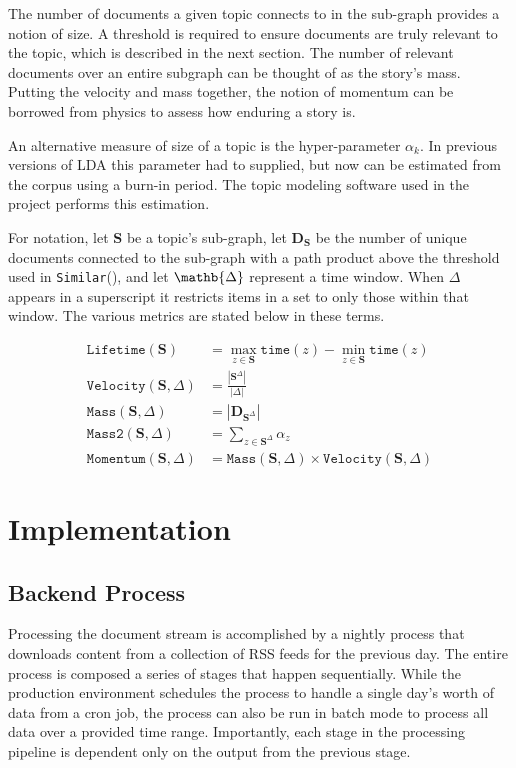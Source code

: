 \documentclass[10pt]{article}
\begin{document}
The number of documents a given topic connects to in the sub-graph provides a notion of size.  A threshold is required to ensure documents are truly relevant to the topic, which is described in the next section.  The number of relevant documents over an entire subgraph can be thought of as the story's mass. Putting the velocity and mass together, the notion of momentum can be borrowed from physics to assess how enduring a story is. 

An alternative measure of size of a topic is the hyper-parameter $\alpha_k$.  In previous versions of LDA this parameter had to supplied, but now can be estimated from the corpus using a burn-in period.  The topic modeling software used in the project performs this estimation.

For notation, let $\mathbf{S}$ be a topic's sub-graph, let $\mathbf{D}_\mathbf{S}$ be the number of unique documents connected to the sub-graph with a path product above the threshold used in \texttt{Similar}(), and let $\mathb{\Delta}$ represent a time window.  When $\Delta$ appears in a superscript it restricts items in a set to only those within that window.  The various metrics are stated below in these terms.

\begin{align}
\texttt{Lifetime}(\mathbf{S}) &=\max_{z \in \mathbf{S}} \texttt{time}(z) - \min_{z \in \mathbf{S}}\texttt{time}(z) \\
\texttt{Velocity}(\mathbf{S}, \Delta) &= \frac{|\mathbf{S}^\Delta|}{|\Delta|} \\
\texttt{Mass}(\mathbf{S}, \Delta) & = |\mathbf{D}_{\mathbf{S}^\Delta}| \\
\texttt{Mass2}(\mathbf{S}, \Delta) & = \sum_{z \in \mathbf{S}^\Delta} \alpha_z\\
\texttt{Momentum}(\mathbf{S}, \Delta) &= \texttt{Mass}(\mathbf{S}, \Delta) \times \texttt{Velocity}(\mathbf{S}, \Delta)
\end{align}

\section {Implementation}
\subsection {Backend Process}
Processing the document stream is accomplished by a nightly process that downloads content from a collection of RSS feeds for the previous day.  The entire process is composed a series of stages that happen sequentially.  While the production environment schedules the process to handle a single day's worth of data from a cron job, the process can also be run in batch mode to process all data over a provided time range.  Importantly, each stage in the processing pipeline is dependent only on the output from the previous stage.
\end{document}
